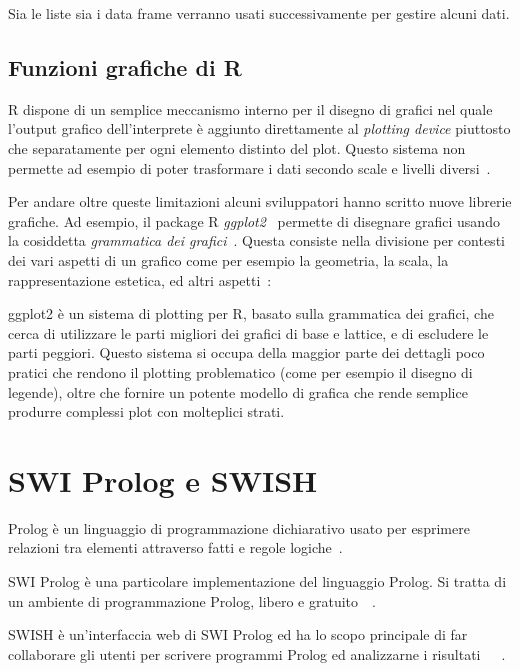 \documentclass[10pt,titlepage,twoside,a4paper]{report}
\begin{document}
Sia le liste sia i data frame verranno usati successivamente per gestire alcuni  
dati.

    \subsection{Funzioni grafiche di R}
R dispone di un semplice meccanismo interno per il disegno di grafici 
nel quale l'output grafico dell'interprete è aggiunto direttamente al 
\emph{plotting device} piuttosto che separatamente per ogni elemento distinto 
del plot. Questo sistema non permette ad esempio di poter trasformare i dati 
secondo scale e livelli diversi~\cite{ggplot2VsRbaseGraphics}.

Per andare oltre queste limitazioni alcuni sviluppatori hanno scritto nuove 
librerie grafiche. Ad esempio, il package R \emph{ggplot2}~\cite{ggplot2}
permette di disegnare grafici usando la cosiddetta \emph{grammatica dei 
grafici}~\cite{grammarOfGraphics}. Questa consiste nella divisione per 
contesti dei vari aspetti di un grafico come per esempio la geometria, la 
scala, la rappresentazione estetica, ed altri 
aspetti~\cite{ggplot2OriginalDefinition}:

\begin{displayquote}
ggplot2 è un sistema di plotting per R, basato sulla grammatica dei grafici,
che cerca di utilizzare le parti migliori dei grafici di base e lattice, e di 
escludere le parti peggiori. Questo sistema si occupa della maggior parte dei
dettagli poco pratici che rendono il plotting problematico (come per esempio 
il disegno di legende), oltre che fornire un potente modello di grafica che
rende semplice produrre complessi plot con molteplici strati.
\end{displayquote}


\section{SWI Prolog e SWISH}
Prolog è un linguaggio di programmazione dichiarativo usato per 
esprimere relazioni tra elementi attraverso fatti e regole 
logiche~\cite{prolog}.

SWI Prolog è una particolare implementazione del linguaggio Prolog. Si tratta 
di un ambiente di programmazione Prolog, libero e 
gratuito~\cite{swiProlog}~\cite{swiPrologAbout}.

SWISH è un'interfaccia web di SWI Prolog ed ha lo scopo principale di far 
collaborare gli utenti per scrivere programmi Prolog ed analizzarne i 
risultati~\cite{swish}~\cite{swishAbout}~\cite{swishInteractiveTutorials}.
\end{document}
